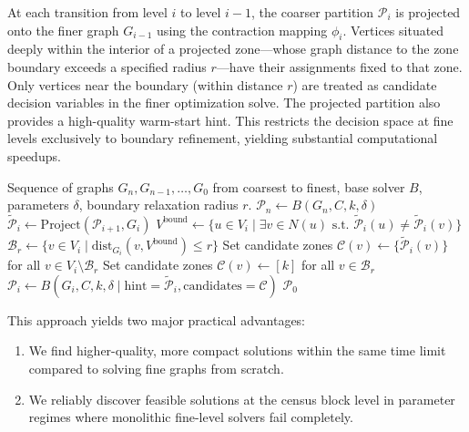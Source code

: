 \documentclass{article}
\begin{document}
At each transition from level $i$ to level $i-1$, the coarser partition $\mathcal{P}_i$ is projected onto the finer graph $G_{i-1}$ using the contraction mapping $\phi_i$. Vertices situated deeply within the interior of a projected zone—whose graph distance to the zone boundary exceeds a specified radius $r$—have their assignments fixed to that zone. Only vertices near the boundary (within distance $r$) are treated as candidate decision variables in the finer optimization solve. The projected partition also provides a high-quality warm-start hint. This restricts the decision space at fine levels exclusively to boundary refinement, yielding substantial computational speedups.

\begin{algorithm}
\caption{Multilevel Strategy}
\begin{algorithmic}[1]
\Require Sequence of graphs $G_n, G_{n-1}, \dots, G_0$ from coarsest to finest, base solver $B$, parameters $\delta$, boundary relaxation radius $r$.
    \State $\mathcal{P}_n \gets B(G_n, C, k, \delta)$ 
        \State $\tilde{\mathcal{P}}_i \gets \text{Project}(\mathcal{P}_{i+1}, G_i)$ 
        \State $V^{\text{bound}} \gets \{u \in V_i \mid \exists v \in N(u) \text{ s.t. } \tilde{\mathcal{P}}_i(u) \neq \tilde{\mathcal{P}}_i(v)\}$
        \State $\mathcal{B}_r \gets \{v \in V_i \mid \text{dist}_{G_i}(v, V^{\text{bound}}) \le r\}$ 
        \State Set candidate zones $\mathcal{C}(v) \gets \{\tilde{\mathcal{P}}_i(v)\}$ for all $v \in V_i \setminus \mathcal{B}_r$ 
        \State Set candidate zones $\mathcal{C}(v) \gets [k]$ for all $v \in \mathcal{B}_r$ 
        \State $\mathcal{P}_i \gets B(G_i, C, k, \delta \mid \text{hint}=\tilde{\mathcal{P}}_i, \text{candidates}=\mathcal{C})$
    \EndFor
    \State \Return $\mathcal{P}_0$
\EndProcedure
\end{algorithmic}
\end{algorithm}

This approach yields two major practical advantages:
\begin{enumerate}
    \item We find higher-quality, more compact solutions within the same time limit compared to solving fine graphs from scratch.
    \item We reliably discover feasible solutions at the census block level in parameter regimes where monolithic fine-level solvers fail completely.
\end{enumerate}
\end{document}

